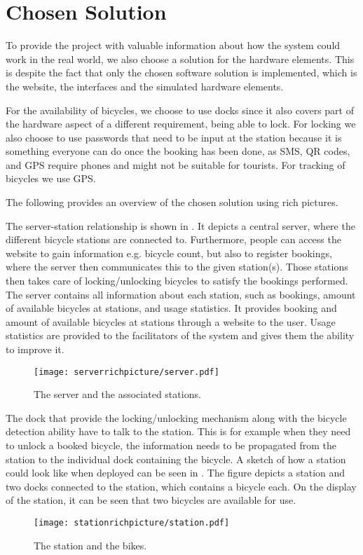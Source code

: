 \section{Chosen Solution}
To provide the project with valuable information about how the system could work in the real world, we also choose a solution for the hardware elements.
This is despite the fact that only the chosen software solution is implemented, which is the website, the interfaces and the simulated hardware elements.

For the availability of bicycles, we choose to use docks since it also covers part of the hardware aspect of a different requirement, being able to lock.  
For locking we also choose to use passwords that need to be input at the station because it is something everyone can do once the booking has been done, as SMS, QR codes, and GPS require phones and might not be suitable for tourists.
For tracking of bicycles we use GPS.

The following provides an overview of the chosen solution using rich pictures.

The server-station relationship is shown in .
It depicts a central server, where the different bicycle stations are connected to.
Furthermore, people can access the website to gain information e.g. bicycle count, but also to register bookings, where the server then communicates this to the given station(s).
Those stations then takes care of locking/unlocking bicycles to satisfy the bookings performed.
The server contains all information about each station, such as bookings, amount of available bicycles at stations, and usage statistics.
It provides booking and amount of available bicycles at stations through a website to the user. 
Usage statistics are provided to the facilitators of the system and gives them the ability to improve it. 

\begin{figure}[h]
\centering
\texttt{[image: serverrichpicture/server.pdf]}
\caption{The server and the associated stations.}
\label{fig:ServerRichPicture}
\end{figure}

The dock that provide the locking/unlocking mechanism along with the bicycle detection ability have to talk to the station. 
This is for example when they need to unlock a booked bicycle, the information needs to be propagated from the station to the individual dock containing the bicycle.
A sketch of how a station could look like when deployed can be seen in .
The figure depicts a station and two docks connected to the station, which contains a bicycle each. 
On the display of the station, it can be seen that two bicycles are available for use.
\begin{figure}[h]
\centering
\texttt{[image: stationrichpicture/station.pdf]}
\caption{The station and the bikes.}
\label{fig:StationRichPicture}
\end{figure}